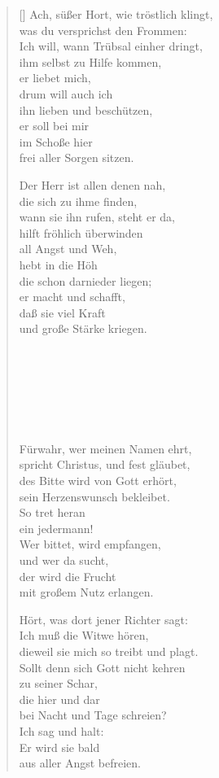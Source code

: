 \begin{multicols}{2}
\begin{verse}[\versewidth]
 Ach, süßer Hort, wie tröstlich klingt,\\
was du versprichst den Frommen:\\
Ich will, wann Trübsal einher dringt,\\
ihm selbst zu Hilfe kommen,\\
er liebet mich,\\
drum will auch ich\\
ihn lieben und beschützen,\\
er soll bei mir\\
im Schoße hier\\
frei aller Sorgen sitzen.

 Der Herr ist allen denen nah,\\
die sich zu ihme finden,\\
wann sie ihn rufen, steht er da,\\
hilft fröhlich überwinden\\
all Angst und Weh,\\
hebt in die Höh\\
die schon darnieder liegen;\\
er macht und schafft,\\
daß sie viel Kraft\\
und große Stärke kriegen.

\begin{verbatim}







\end{verbatim}

 Fürwahr, wer meinen Namen ehrt,\\
spricht Christus, und fest gläubet,\\
des Bitte wird von Gott erhört,\\
sein Herzenswunsch bekleibet.\\
So tret heran\\
ein jedermann!\\
Wer bittet, wird empfangen,\\
und wer da sucht,\\
der wird die Frucht\\
mit großem Nutz erlangen.

 Hört, was dort jener Richter sagt:\\
Ich muß die Witwe hören,\\
dieweil sie mich so treibt und plagt.\\
Sollt denn sich Gott nicht kehren\\
zu seiner Schar,\\
die hier und dar\\
bei Nacht und Tage schreien?\\
Ich sag und halt:\\
Er wird sie bald\\
aus aller Angst befreien.


\end{verse}
\end{multicols}
